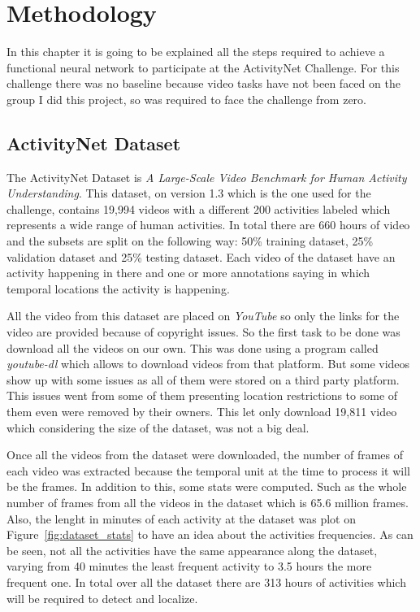 \chapter{Methodology}

In this chapter it is going to be explained all the steps required to achieve a functional neural network to participate at the ActivityNet Challenge. For this challenge there was no baseline because video tasks have not been faced on the group I did this project, so was required to face the challenge from zero.

\section{ActivityNet Dataset}

The ActivityNet Dataset\cite{caba2015activitynet} is \textit{A Large-Scale Video Benchmark for
Human Activity Understanding}. This dataset, on version 1.3 which is the one used for the challenge, contains 19,994 videos with a different 200 activities labeled which represents a wide range of human activities. In total there are 660 hours of video and the subsets are split on the following way: 50\% training dataset, 25\% validation dataset and 25\% testing dataset. Each video of the dataset have an activity happening in there and one or more annotations saying in which temporal locations the activity is happening.

All the video from this dataset are placed on \textit{YouTube} so only the links for the video are provided because of copyright issues. So the first task to be done was download all the videos on our own. This was done using a program called \textit{youtube-dl} which allows to download videos from that platform. But some videos show up with some issues as all of them were stored on a third party platform. This issues went from some of them presenting location restrictions to some of them  even were removed by their owners. This let only download 19,811 video which considering the size of the dataset, was not a big deal.

Once all the videos from the dataset were downloaded, the number of frames of each video was extracted because the temporal unit at the time to process it will be the frames. In addition to this, some stats were computed. Such as the whole number of frames from all the videos in the dataset which is 65.6 million frames. Also, the lenght in minutes of each activity at the dataset was plot on Figure~\ref{fig:dataset_stats} to have an idea about the activities frequencies. As can be seen, not all the activities have the same appearance along the dataset, varying from 40 minutes the least frequent activity to 3.5 hours the more frequent one. In total over all the dataset there are 313 hours of activities which will be required to detect and localize.

